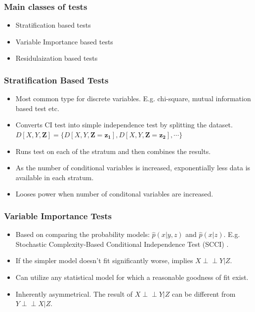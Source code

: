 \documentclass{beamer}
\def\ci{\perp\!\!\!\!\!\perp}
\begin{document}
\begin{frame}
	\frametitle{Main classes of tests}
	\begin{itemize}
		\setlength\itemsep{1em}
		\item Stratification based tests
		\item Variable Importance based tests
		\item Residulaization based tests
	\end{itemize}
\end{frame}

\begin{frame}
	\frametitle{Stratification Based Tests}
	\begin{itemize}
		\setlength\itemsep{1em}
		\item Most common type for discrete variables. E.g. chi-square,
			mutual information based test etc. 
		\item Converts CI test into simple independence test by splitting 
			the dataset.
		$ D[X, Y, \bm{Z}] = \{ D[X, Y, \bm{Z}=\bm{z_1}], D[X, Y, \bm{Z}=\bm{z_2}], \cdots \} $	
		\item Runs test on each of the stratum and then combines the results.
		\item As the number of conditional variables is increased, exponentially
			less data is available in each stratum.
		\item Looses power when number of conditonal variables
			are increased.
	\end{itemize}
\end{frame}

\begin{frame}
	\frametitle{Variable Importance Tests}
	\begin{itemize}
		\setlength\itemsep{1em}
		\item Based on comparing the probability models: $\hat{p}(x |
			y, z) $ and $ \hat{p}(x | z) $. E.g. Stochastic
			Complexity-Based Conditional Independence Test (SCCI) \footnotemark.
		\item If the simpler model doesn't fit significantly worse, implies $ X \ci Y | Z $.
		\item Can utilize any statistical model for which a reasonable goodness
			of fit exist.
		\item Inherently asymmetrical. The result of $ X \ci Y | Z $
			can be different from $ Y \ci X | Z $.
	\end{itemize}

\end{frame}
\end{document}
